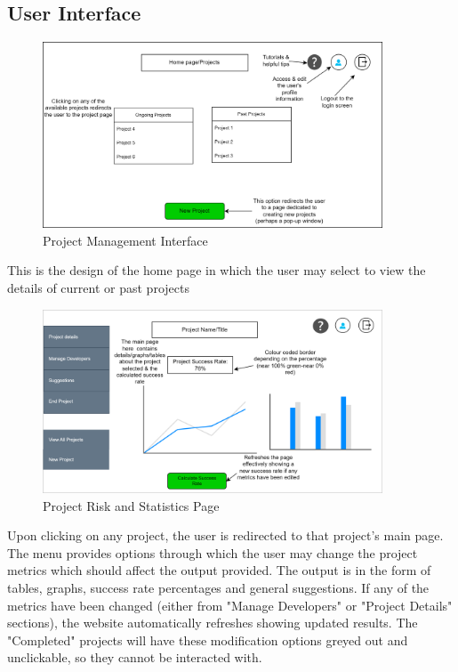 \documentclass[a4paper]{article}
\theoremstyle{plain}
\theoremstyle{definition}
\theoremstyle{remark}
\begin{document}
\subsection*{User Interface}
\begin{figure}[H]
	\centering
	\includegraphics[width=0.9\textwidth]{prm.png}
	\caption{Project Management Interface}
	\label{fig:prm-png}
\end{figure}
This is the design of the home page in which the user may select to view the details of current or past projects
\begin{figure}[H]
	\centering
	\includegraphics[width=0.9\textwidth]{prs.png}
	\caption{Project Risk and Statistics Page}
	\label{fig:prs-png}
\end{figure}
\noindent Upon clicking on any project, the user is redirected to that project's main page.\\

\noindent The menu provides options through which the user may change the project metrics which should affect the output provided. The output is in the form of tables, graphs, success rate percentages and general suggestions. If any of the metrics have been changed (either from "Manage Developers" or "Project Details" sections), the website automatically refreshes showing updated results. The "Completed" projects will have these modification options greyed out and unclickable, so they cannot be interacted with.
\end{document}
